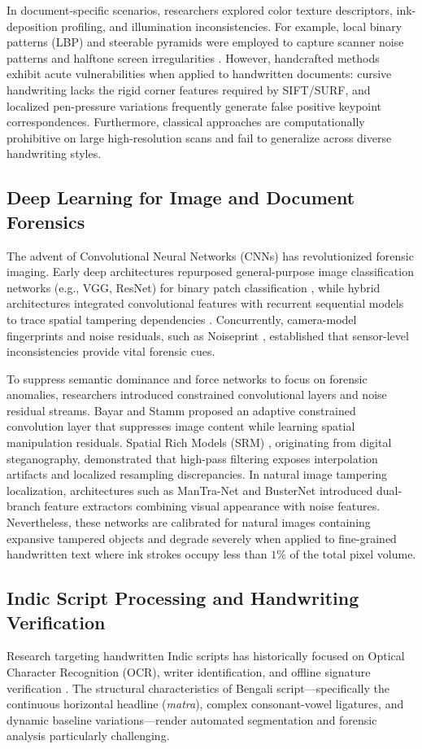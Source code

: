 \documentclass[pdflatex,sn-mathphys-num,iicol]{sn-jnl}
\begin{document}
In document-specific scenarios, researchers explored color texture descriptors, ink-deposition profiling, and illumination inconsistencies. For example, local binary patterns (LBP) and steerable pyramids were employed to capture scanner noise patterns and halftone screen irregularities \cite{bib1}. However, handcrafted methods exhibit acute vulnerabilities when applied to handwritten documents: cursive handwriting lacks the rigid corner features required by SIFT/SURF, and localized pen-pressure variations frequently generate false positive keypoint correspondences. Furthermore, classical approaches are computationally prohibitive on large high-resolution scans and fail to generalize across diverse handwriting styles.

\subsection{Deep Learning for Image and Document Forensics}\label{subsec2_2}
The advent of Convolutional Neural Networks (CNNs) has revolutionized forensic imaging. Early deep architectures repurposed general-purpose image classification networks (e.g., VGG, ResNet) for binary patch classification \cite{bib4}, while hybrid architectures integrated convolutional features with recurrent sequential models to trace spatial tampering dependencies \cite{bib5}. Concurrently, camera-model fingerprints and noise residuals, such as Noiseprint \cite{bib3}, established that sensor-level inconsistencies provide vital forensic cues.

To suppress semantic dominance and force networks to focus on forensic anomalies, researchers introduced constrained convolutional layers and noise residual streams. Bayar and Stamm \cite{bib7} proposed an adaptive constrained convolution layer that suppresses image content while learning spatial manipulation residuals. Spatial Rich Models (SRM) \cite{bib8}, originating from digital steganography, demonstrated that high-pass filtering exposes interpolation artifacts and localized resampling discrepancies. In natural image tampering localization, architectures such as ManTra-Net \cite{bib9} and BusterNet \cite{bib10} introduced dual-branch feature extractors combining visual appearance with noise features. Nevertheless, these networks are calibrated for natural images containing expansive tampered objects and degrade severely when applied to fine-grained handwritten text where ink strokes occupy less than $1\%$ of the total pixel volume.

\subsection{Indic Script Processing and Handwriting Verification}\label{subsec2_3}
Research targeting handwritten Indic scripts has historically focused on Optical Character Recognition (OCR), writer identification, and offline signature verification \cite{bib2,bib11,bib12}. The structural characteristics of Bengali script---specifically the continuous horizontal headline (\textit{matra}), complex consonant-vowel ligatures, and dynamic baseline variations---render automated segmentation and forensic analysis particularly challenging.
\end{document}
